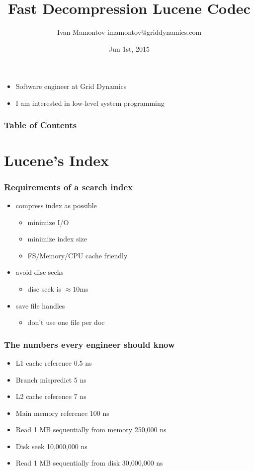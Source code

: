 \documentclass{beamer}
\title{Fast Decompression Lucene Codec}
\author{Ivan Mamontov imamontov@griddynamics.com}
\institute{Berlin Buzzwords}
\date{Jun 1st, 2015}
\begin{document}
	\begin{frame}
		\titlepage
	\end{frame}

	\begin{frame}
    		\begin{itemize}
    			\frametitle{About me}
    		    \item Software engineer at Grid Dynamics
    		    \item I am interested in low-level system programming
		\end{itemize}
  	\end{frame}
  	\begin{frame}
  		\frametitle{Table of Contents}
  		\tableofcontents
  	\end{frame}
  	\section{Lucene's Index}
  	\begin{frame}
		\frametitle{Requirements of a search index}
		\begin{itemize}
		\item compress index as possible
			\begin{itemize}
			\item minimize I/O
			\item minimize index size
			\item FS/Memory/CPU cache friendly
			\end{itemize}
		\item avoid disc seeks
			\begin{itemize}
				\item disc seek is $\approx10$ms 
			\end{itemize}				
		\item save file handles
			\begin{itemize}
				\item don't use one file per doc
			\end{itemize}		
		\end{itemize}
  	\end{frame}	
  	\begin{frame}
  		\frametitle{The numbers every engineer should know}
  		\begin{itemize}
  		\item L1 cache reference 0.5 ns
  		\item Branch mispredict 5 ns
  		\item L2 cache reference 7 ns
  		\item Main memory reference 100 ns
  		\item Read 1 MB sequentially from memory 250,000 ns
  		\item Disk seek 10,000,000 ns
  		\item Read 1 MB sequentially from disk 30,000,000 ns
  		\end{itemize}
  	\end{frame}
\end{document}
